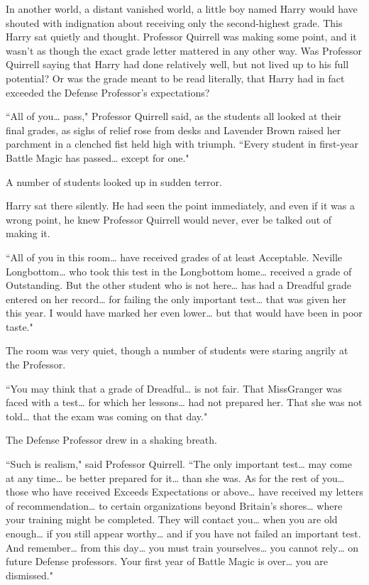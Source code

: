 In another world, a distant vanished world, a little boy named Harry would have shouted with indignation about receiving only the second-highest grade. This Harry sat quietly and thought. Professor Quirrell was making some point, and it wasn't as though the exact grade letter mattered in any other way. Was Professor Quirrell saying that Harry had done relatively well, but not lived up to his full potential? Or was the grade meant to be read literally, that Harry had in fact exceeded the Defense Professor's expectations?

``All of you{\ldots} pass," Professor Quirrell said, as the students all looked at their final grades, as sighs of relief rose from desks and Lavender Brown raised her parchment in a clenched fist held high with triumph. ``Every student in first-year Battle Magic has passed{\ldots} except for one."

A number of students looked up in sudden terror.

Harry sat there silently. He had seen the point immediately, and even if it was a wrong point, he knew Professor Quirrell would never, ever be talked out of making it.

``All of you in this room{\ldots} have received grades of at least Acceptable. Neville Longbottom{\ldots} who took this test in the Longbottom home{\ldots} received a grade of Outstanding. But the other student who is not here{\ldots} has had a Dreadful grade entered on her record{\ldots} for failing the only important test{\ldots} that was given her this year. I would have marked her even lower{\ldots} but that would have been in poor taste."

The room was very quiet, though a number of students were staring angrily at the Professor.

``You may think that a grade of Dreadful{\ldots} is not fair. That Miss\?Granger was faced with a test{\ldots} for which her lessons{\ldots} had not prepared her. That she was not told{\ldots} that the exam was coming on that day."

The Defense Professor drew in a shaking breath.

``Such is realism," said Professor Quirrell. ``The only important test{\ldots} may come at any time{\ldots} be better prepared for it{\ldots} than she was. As for the rest of you{\ldots} those who have received Exceeds Expectations or above{\ldots} have received my letters of recommendation{\ldots} to certain organizations beyond Britain's shores{\ldots} where your training might be completed. They will contact you{\ldots} when you are old enough{\ldots} if you still appear worthy{\ldots} and if you have not failed an important test. And remember{\ldots} from this day{\ldots} you must train yourselves{\ldots} you cannot rely{\ldots} on future Defense professors. Your first year of Battle Magic is over{\ldots} you are dismissed."

